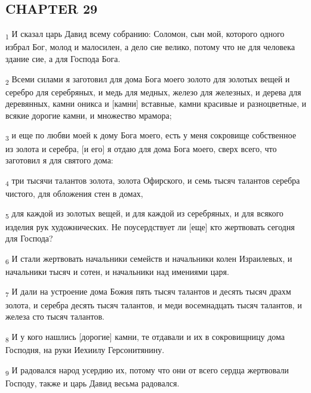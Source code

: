 \subsection{CHAPTER 29}
\begin{tcolorbox}
\textsubscript{1} И сказал царь Давид всему собранию: Соломон, сын мой, которого одного избрал Бог, молод и малосилен, а дело сие велико, потому что не для человека здание сие, а для Господа Бога.
\end{tcolorbox}
\begin{tcolorbox}
\textsubscript{2} Всеми силами я заготовил для дома Бога моего золото для золотых вещей и серебро для серебряных, и медь для медных, железо для железных, и дерева для деревянных, камни оникса и [камни] вставные, камни красивые и разноцветные, и всякие дорогие камни, и множество мрамора;
\end{tcolorbox}
\begin{tcolorbox}
\textsubscript{3} и еще по любви моей к дому Бога моего, есть у меня сокровище собственное из золота и серебра, [и его] я отдаю для дома Бога моего, сверх всего, что заготовил я для святого дома:
\end{tcolorbox}
\begin{tcolorbox}
\textsubscript{4} три тысячи талантов золота, золота Офирского, и семь тысяч талантов серебра чистого, для обложения стен в домах,
\end{tcolorbox}
\begin{tcolorbox}
\textsubscript{5} для каждой из золотых вещей, и для каждой из серебряных, и для всякого изделия рук художнических. Не поусердствует ли [еще] кто жертвовать сегодня для Господа?
\end{tcolorbox}
\begin{tcolorbox}
\textsubscript{6} И стали жертвовать начальники семейств и начальники колен Израилевых, и начальники тысяч и сотен, и начальники над имениями царя.
\end{tcolorbox}
\begin{tcolorbox}
\textsubscript{7} И дали на устроение дома Божия пять тысяч талантов и десять тысяч драхм золота, и серебра десять тысяч талантов, и меди восемнадцать тысяч талантов, и железа сто тысяч талантов.
\end{tcolorbox}
\begin{tcolorbox}
\textsubscript{8} И у кого нашлись [дорогие] камни, те отдавали и их в сокровищницу дома Господня, на руки Иехиилу Герсонитянину.
\end{tcolorbox}
\begin{tcolorbox}
\textsubscript{9} И радовался народ усердию их, потому что они от всего сердца жертвовали Господу, также и царь Давид весьма радовался.
\end{tcolorbox}
